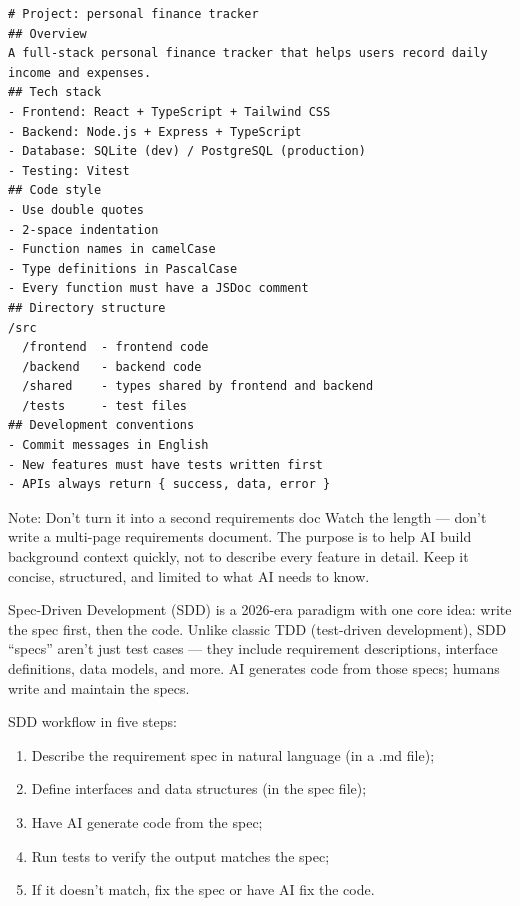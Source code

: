 \begin{lstlisting}
# Project: personal finance tracker
## Overview
A full-stack personal finance tracker that helps users record daily income and expenses.
## Tech stack
- Frontend: React + TypeScript + Tailwind CSS
- Backend: Node.js + Express + TypeScript
- Database: SQLite (dev) / PostgreSQL (production)
- Testing: Vitest
## Code style
- Use double quotes
- 2-space indentation
- Function names in camelCase
- Type definitions in PascalCase
- Every function must have a JSDoc comment
## Directory structure
/src
  /frontend  - frontend code
  /backend   - backend code
  /shared    - types shared by frontend and backend
  /tests     - test files
## Development conventions
- Commit messages in English
- New features must have tests written first
- APIs always return { success, data, error }
\end{lstlisting}

\begin{tcbwarn}{Note: Don't turn it into a second requirements doc}
Watch the length — don't write a multi-page requirements document. The purpose is to help AI build background context quickly, not to describe every feature in detail. Keep it concise, structured, and limited to what AI needs to know.

\end{tcbwarn}


Spec-Driven Development (SDD) is a 2026-era paradigm with one core idea: write the spec first, then the code. Unlike classic TDD (test-driven development), SDD “specs” aren't just test cases — they include requirement descriptions, interface definitions, data models, and more. AI generates code from those specs; humans write and maintain the specs.

SDD workflow in five steps:

\begin{enumerate}
  \item Describe the requirement spec in natural language (in a .md file);
  \item Define interfaces and data structures (in the spec file);
  \item Have AI generate code from the spec;
  \item Run tests to verify the output matches the spec;
  \item If it doesn't match, fix the spec or have AI fix the code.
\end{enumerate}

